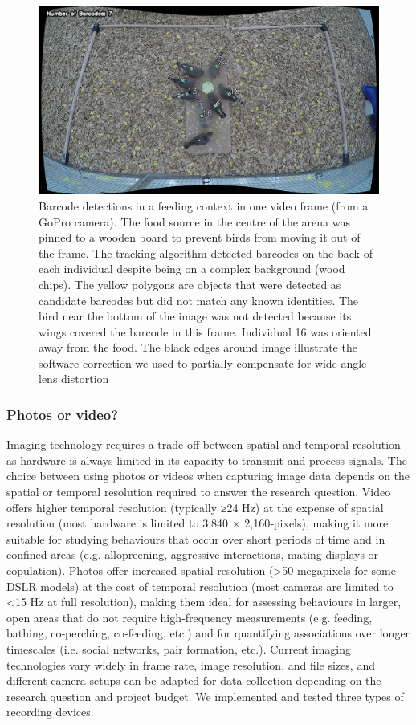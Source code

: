 \documentclass[11pt,a4paper,oneside]{book}
\begin{document}
\begin{figure}[!htb]
    \centering
    \includegraphics{Graving_IMPRS_Thesis/figures/bird_figure_3.jpg}
    \caption{Barcode detections in a feeding context in one video frame (from a GoPro camera). The food source in the centre of the arena was pinned to a wooden board to prevent birds from moving it out of the frame. The tracking algorithm detected barcodes on the back of each individual despite being on a complex background (wood chips). The yellow polygons are objects that were detected as candidate barcodes but did not match any known identities. The bird near the bottom of the image was not detected because its wings covered the barcode in this frame. Individual 16 was oriented away from the food. The black edges around image illustrate the software correction we used to partially compensate for wide‐angle lens distortion
}
    \label{fig:bird_figure_3}
\end{figure}

\subsubsection{Photos or video?}
Imaging technology requires a trade‐off between spatial and temporal resolution as hardware is always limited in its capacity to transmit and process signals. The choice between using photos or videos when capturing image data depends on the spatial or temporal resolution required to answer the research question. Video offers higher temporal resolution (typically ≥24 Hz) at the expense of spatial resolution (most hardware is limited to 3,840 × 2,160‐pixels), making it more suitable for studying behaviours that occur over short periods of time and in confined areas (e.g. allopreening, aggressive interactions, mating displays or copulation). Photos offer increased spatial resolution (>50 megapixels for some DSLR models) at the cost of temporal resolution (most cameras are limited to <15 Hz at full resolution), making them ideal for assessing behaviours in larger, open areas that do not require high‐frequency measurements (e.g. feeding, bathing, co‐perching, co‐feeding, etc.) and for quantifying associations over longer timescales (i.e. social networks, pair formation, etc.). Current imaging technologies vary widely in frame rate, image resolution, and file sizes, and different camera setups can be adapted for data collection depending on the research question and project budget. We implemented and tested three types of recording devices.
\end{document}
